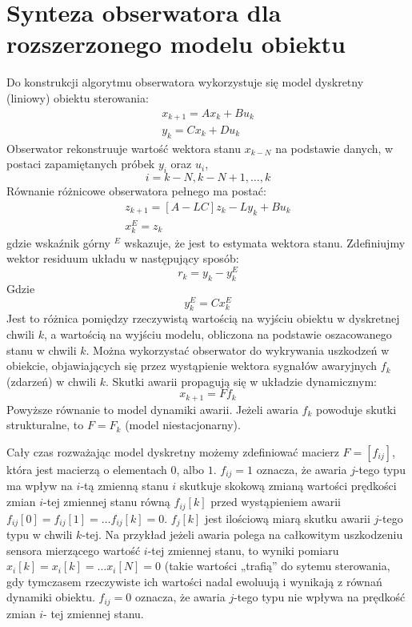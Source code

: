 \documentclass{article}
\begin{document}
	\maketitle
	\section{Synteza obserwatora dla rozszerzonego modelu obiektu}
		Do konstrukcji algorytmu obserwatora wykorzystuje się model dyskretny (liniowy)
		obiektu sterowania:
		\begin{align*}
			x_{k+1} = Ax_k + Bu_k \\ 
			y_k = C x_k + Du_k
		\end{align*}
		Obserwator rekonstruuje wartość wektora stanu $x_{k-N}$
		na podstawie danych, w postaci zapamiętanych próbek $y_i$ oraz $u_i$,
		\begin{equation}
			i=k-N, k-N+1, \ldots , k
		\end{equation}
		Równanie różnicowe obserwatora pełnego ma postać:
		\begin{align*}
			z_{k+1} = [A-LC] z_k - Ly_k + Bu_k \\ 
			x^E_k = z_k
		\end{align*}
		gdzie wskaźnik górny $^E$ wskazuje, że jest to estymata wektora stanu.
		Zdefiniujmy wektor residuum układu w następujący sposób:
		\begin{equation}
			r_k = y_k - y^E_k
		\end{equation}
		Gdzie 
		\begin{equation}
			y^E_k = Cx^E_k
		\end{equation}
		Jest to różnica pomiędzy rzeczywistą wartością na wyjściu obiektu w dyskretnej chwili $k$, a
		wartością na wyjściu modelu, obliczona na podstawie oszacowanego stanu w chwili $k$.
		Można wykorzystać obserwator do wykrywania uszkodzeń w obiekcie, objawiających się
		przez wystąpienie wektora sygnałów awaryjnych $f_k$ (zdarzeń) w chwili $k$. Skutki awarii
		propagują się w układzie dynamicznym:
		\begin{equation}
			x_{k+1} = F f_k
		\end{equation}
		Powyższe równanie to model dynamiki awarii. Jeżeli awaria $f_k$ powoduje skutki strukturalne, to
		$F = F_k$ (model niestacjonarny).
		
		Cały czas rozważając model dyskretny możemy zdefiniować
		macierz $F = [ f_{ij} ]$, która jest macierzą o elementach $0$, albo $1$. $f_{ij} = 1$ oznacza, że awaria $j$-tego
		typu ma wpływ na $i$-tą zmienną stanu $i$ skutkuje skokową zmianą wartości prędkości
		zmian $i$-tej zmiennej stanu równą $f_{ij}[k]$ przed wystąpieniem awarii
		$ f_{ij}[0]= f_{ij}[1]= \ldots f_{ij}[k]= 0 $.
		$f_j[k]$ jest ilościową miarą skutku awarii $j$-tego typu w chwili $k$-tej. Na przykład jeżeli
		awaria polega na całkowitym uszkodzeniu sensora mierzącego wartość $i$-tej zmiennej
		stanu, to wyniki pomiaru $x_i[k] = x_i[k] = \ldots x_i[N] = 0$ (takie wartości „trafią” do sytemu
		sterowania, gdy tymczasem rzeczywiste ich wartości nadal ewoluują i wynikają z równań
		dynamiki obiektu. $f_{ij} = 0$ oznacza, że awaria $j$-tego typu nie wpływa na prędkość zmian $i$-
		tej zmiennej stanu.
\end{document}

